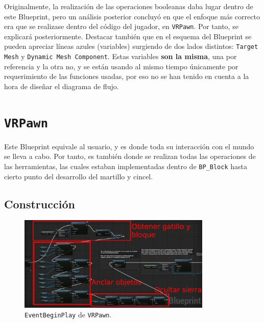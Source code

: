 Originalmente, la realización de las operaciones booleanas daba lugar dentro de este Blueprint, pero un análisis posterior concluyó en que el enfoque más correcto era que se realizase dentro del código del jugador, en \texttt{VRPawn}. Por tanto, se explicará posteriormente. Destacar también que en el esquema del Blueprint se pueden apreciar líneas azules (variables) surgiendo de dos lados distintos: \texttt{Target Mesh} y \texttt{Dynamic Mesh Component}. Estas variables \textbf{son la misma}, una por referencia y la otra no, y se están usando al mismo tiempo únicamente por requerimiento de las funciones usadas, por eso no se han tenido en cuenta a la hora de diseñar el diagrama de flujo.

\section{\texttt{VRPawn}}

Este Blueprint equivale al usuario, y es donde toda su interacción con el mundo se lleva a cabo. Por tanto, es también donde se realizan todas las operaciones de las herramientas, las cuales estaban implementadas dentro de \texttt{BP\_Block} hasta cierto punto del desarrollo del martillo y cincel.

\subsection{Construcción}

\begin{figure}[H]
	\centering
	\includegraphics[width=9.2cm]{imagenes/constructor}
	\caption{\texttt{EventBeginPlay} de \texttt{VRPawn}.}
	\label{fig:constructor}
\end{figure}

